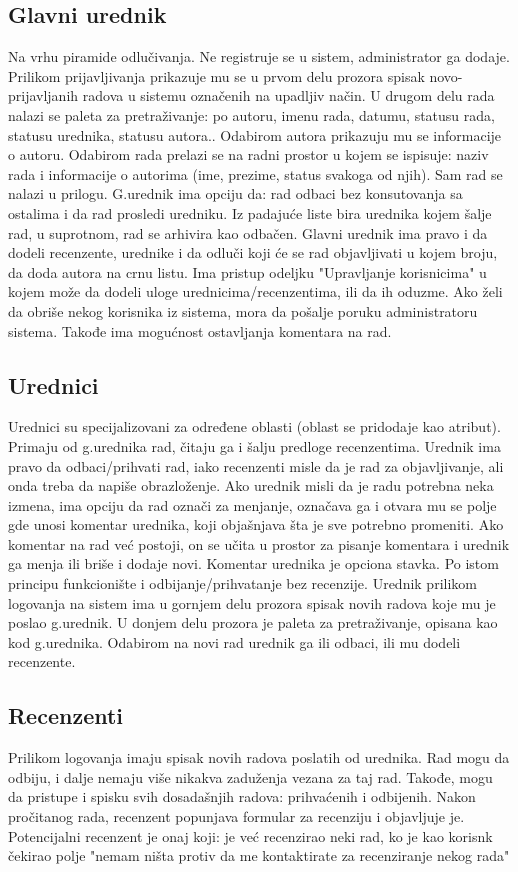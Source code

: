 \documentclass[a4paper,14,4pt]{article}
\begin{document}
    \subsection{Glavni urednik}
    Na vrhu piramide odlučivanja. Ne registruje se u sistem, administrator ga dodaje. Prilikom prijavljivanja prikazuje mu se u prvom delu prozora spisak novo-prijavljanih radova u sistemu označenih na upadljiv način. U drugom delu rada nalazi se paleta za pretraživanje: po autoru, imenu rada, datumu, statusu rada, statusu urednika, statusu autora.. Odabirom autora prikazuju mu se informacije o autoru. Odabirom rada prelazi se na radni prostor u kojem se ispisuje: naziv rada i informacije o autorima (ime, prezime, status svakoga od njih). Sam rad se nalazi u prilogu. G.urednik ima opciju da: rad odbaci bez konsutovanja sa ostalima i da rad prosledi uredniku. Iz padajuće liste bira urednika kojem šalje rad, u suprotnom, rad se arhivira kao odbačen. Glavni urednik ima pravo i da dodeli recenzente, urednike i da odluči koji će se rad objavljivati u kojem broju, da doda autora na crnu listu. Ima pristup odeljku "Upravljanje korisnicima" u kojem može da dodeli uloge urednicima/recenzentima, ili da ih oduzme. Ako želi da obriše nekog korisnika iz sistema, mora da pošalje poruku administratoru sistema. Takođe ima mogućnost ostavljanja komentara na rad.

    \subsection{Urednici}
    Urednici su specijalizovani za određene oblasti (oblast se pridodaje kao atribut). Primaju od g.urednika rad, čitaju ga i šalju predloge recenzentima. Urednik ima pravo da odbaci/prihvati rad, iako recenzenti misle da je rad za objavljivanje, ali onda treba da napiše obrazloženje. Ako urednik misli da je radu potrebna neka izmena, ima opciju da rad označi za menjanje, označava ga i otvara mu se polje gde unosi komentar urednika, koji objašnjava šta je sve potrebno promeniti. Ako komentar  na rad već postoji, on se učita u prostor za pisanje komentara i urednik ga menja ili briše i dodaje novi. Komentar urednika je opciona stavka. Po istom principu funkcionište i odbijanje/prihvatanje bez recenzije. Urednik prilikom logovanja na sistem ima u gornjem delu prozora spisak novih radova koje mu je poslao g.urednik. U donjem delu prozora je paleta za pretraživanje, opisana kao kod g.urednika. Odabirom na novi rad urednik ga ili odbaci, ili mu dodeli recenzente.

    \subsection{Recenzenti}
    Prilikom logovanja imaju spisak novih radova poslatih od urednika. Rad mogu da odbiju, i dalje nemaju više nikakva zaduženja vezana za taj rad. Takođe, mogu da pristupe i spisku svih dosadašnjih radova: prihvaćenih i odbijenih. Nakon pročitanog rada, recenzent popunjava formular za recenziju i objavljuje je. Potencijalni recenzent je onaj koji: je već recenzirao neki rad, ko je  kao korisnk čekirao polje "nemam ništa protiv da me kontaktirate za recenziranje nekog rada"
\end{document}
